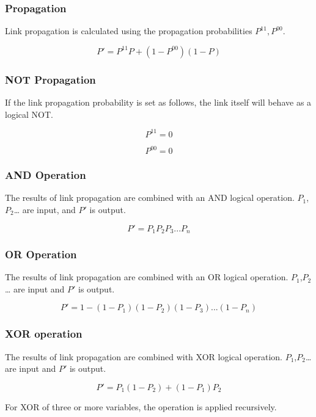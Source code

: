 \documentclass[12pt]{article}
\begin{document}
\subsubsection{Propagation}\label{propagation}

Link propagation is calculated using the propagation probabilities
\(P^{11},P^{00}\).

\[ P' = P^{11} P+(1-P^{00})( 1-P )\]

\subsubsection{NOT Propagation}\label{not-propagation}

If the link propagation probability is set as follows, the link itself
will behave as a logical NOT.

\[P^{11}=0\]

\[P^{00}=0\]

\subsubsection{AND Operation}\label{and-operation}

The results of link propagation are combined with an AND logical
operation. \(P_1\),\(P_2\)\ldots{} are input, and \(P'\) is output.

\[ P'= {P}_{1} {P}_{2} {P}_{3} ...{P}_{n} \]

\subsubsection{OR Operation}\label{or-operation}

The results of link propagation are combined with an OR logical
operation. \(P_1\),\(P_2\)\ldots{} are input and \(P'\) is output.

\[ P' = 1 - (1-{P}_{1})(1-{P}_{2})(1-{P}_{3})... (1-{P}_{n}) \]

\subsubsection{XOR operation}\label{xor-operation}

The results of link propagation are combined with XOR logical operation.
\(P_1\),\(P_2\)\ldots{} are input and \(P'\) is output.

\[ P' = P_1(1-P_2) + (1-P_1) P_2\]

For XOR of three or more variables, the operation is applied
recursively.
\end{document}
